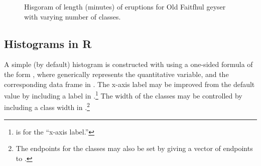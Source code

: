 \documentclass[10pt,openany]{book}\usepackage[]{graphicx}\usepackage[]{color}
\newenvironment{knitrout}{}{} %
\begin{document}
\begin{knitrout}
\color{fgcolor}


















































\begin{figure}[hbtp]

{\centering {}

}

\caption[Hisgoram of length (minutes) of eruptions for Old Faitfhul geyser with varying number of classes]{Hisgoram of length (minutes) of eruptions for Old Faitfhul geyser with varying number of classes.}\label{fig:histOF}
\end{figure}


\end{knitrout}

\subsection{Histograms in R}
A simple (by default) histogram is constructed with  using a one-sided formula of the form , where  generically represents the quantitative variable, and the corresponding data frame in .  The x-axis label may be improved from the default value by including a label in .\footnote{ is for the ``x-axis label.''}  The width of the classes may be controlled by including a class width in .\footnote{The endpoints for the classes may also be set by giving a vector of endpoints to .}
\end{document}
